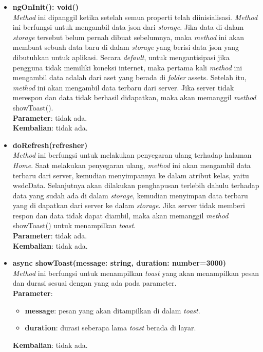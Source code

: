 \begin{enumerate}
\begin{itemize}
		\item \textbf{ngOnInit(): void()} \\
			\textit{Method} ini dipanggil ketika setelah semua properti telah diinisialisasi. \textit{Method} ini berfungsi untuk mengambil data json dari \textit{storage}. Jika data di dalam \textit{storage} tersebut belum pernah dibuat sebelumnya, maka \textit{method} ini akan membuat sebuah data baru di dalam \textit{storage} yang berisi data json yang dibutuhkan untuk aplikasi. Secara \textit{default}, untuk mengantisipasi jika pengguna tidak memiliki koneksi internet, maka pertama kali \textit{method} ini mengambil data adalah dari aset yang berada di \textit{folder} assets. Setelah itu, \textit{method} ini akan mengambil data terbaru dari server. Jika server tidak merespon dan data tidak berhasil didapatkan, maka akan memanggil \textit{method} showToast(). \\
			\textbf{Parameter}: tidak ada. \\
			\textbf{Kembalian}: tidak ada.
			
		\item \textbf{doRefresh(refresher)} \\
			\textit{Method} ini berfungsi untuk melakukan penyegaran ulang terhadap halaman \textit{Home}. Saat melakukan penyegaran ulang, \textit{method} ini akan mengambil data terbaru dari server, kemudian menyimpannya ke dalam atribut kelas, yaitu wsdcData. Selanjutnya akan dilakukan penghapusan terlebih dahulu terhadap data yang sudah ada di dalam \textit{storage}, kemudian menyimpan data terbaru yang di dapatkan dari server ke dalam \textit{storage}. Jika server tidak memberi respon dan data tidak dapat diambil, maka akan memanggil \textit{method} showToast() untuk menampilkan \textit{toast}. \\
			\textbf{Parameter}: tidak ada. \\
			\textbf{Kembalian}: tidak ada.
			
		\item \textbf{async showToast(message: string, duration: number=3000)}\\
			\textit{Method} ini berfungsi untuk menampilkan \textit{toast} yang akan menampilkan pesan dan durasi sesuai dengan yang ada pada parameter.\\
			\textbf{Parameter}:
			\begin{itemize}
				\item \textbf{message}: pesan yang akan ditampilkan di dalam \textit{toast}.
				\item \textbf{duration}: durasi seberapa lama \textit{toast} berada di layar.
			\end{itemize}
			\textbf{Kembalian}: tidak ada.
			

\end{itemize}
\end{enumerate}
